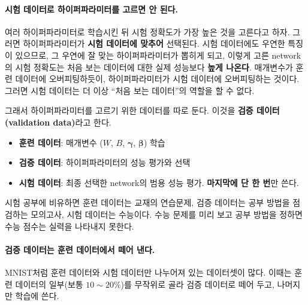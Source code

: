 \documentclass[11pt,a4paper]{article}
\begin{document}
\paragraph{시험 데이터로 하이퍼파라미터를 고르면 안 된다.}
여러 하이퍼파라미터로 학습시킨 뒤 시험 정확도가 가장 높은 것을 고른다고 하자.
그러면 하이퍼파라미터가 \textbf{시험 데이터에 맞추어} 선택된다.
시험 데이터에도 우연한 특징이 있으므로, 그 우연에 잘 맞는 하이퍼파라미터가 뽑히게 되고,
이렇게 고른 network의 시험 정확도는 처음 보는 데이터에 대한 실제 성능보다 \textbf{높게 나온다}.
매개변수가 훈련 데이터에 오버피팅하듯이, 하이퍼파라미터가 시험 데이터에 오버피팅하는 것이다.
그러면 시험 데이터는 더 이상 ``처음 보는 데이터''의 역할을 할 수 없다.

그래서 하이퍼파라미터를 고르기 위한 데이터를 따로 둔다.
이것을 \textbf{검증 데이터(validation data)}라고 한다.

\begin{keybox}[훈련 / 검증 / 시험 데이터]
\begin{itemize}[leftmargin=1.5em]
\item \textbf{훈련 데이터}: 매개변수 ($W$, $B$, $\bm\gamma$, $\bm\beta$) 학습
\item \textbf{검증 데이터}: 하이퍼파라미터의 성능 평가와 선택
\item \textbf{시험 데이터}: 최종 선택한 network의 범용 성능 평가. \textbf{마지막에 단 한 번}만 쓴다.
\end{itemize}
\end{keybox}

시험 공부에 비유하면 훈련 데이터는 교재의 연습문제, 검증 데이터는 공부 방법을 점검하는 모의고사,
시험 데이터는 수능이다. 수능 문제를 미리 보고 공부 방법을 정하면 수능 점수는 실력을 나타내지 못한다.

\paragraph{검증 데이터는 훈련 데이터에서 떼어 낸다.}
MNIST처럼 훈련 데이터와 시험 데이터만 나누어져 있는 데이터셋이 많다.
이때는 훈련 데이터의 일부(보통 $10\sim20\%$)를 무작위로 골라 검증 데이터로 떼어 두고, 나머지만 학습에 쓴다.
\end{document}
